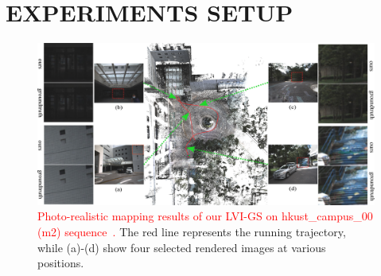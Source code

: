 \documentclass[lettersize,journal]{IEEEtran}
\begin{document}
\section{EXPERIMENTS SETUP}
\begin{figure}[ht]  %
        \captionsetup{justification=justified, labelsep=colon}%
        \centering
        \includegraphics[width=2.0\columnwidth]{image/fullseq/fullseq.pdf}
        \caption{
        \textcolor{red}{
        Photo-realistic mapping results of our LVI-GS on hkust_campus_00 (m2) sequence~\cite{r3live}. 
        }
        The red line represents the running trajectory, while (a)-(d) show four selected rendered images at various positions.
        }
        \label{fig:fullseq}
\end{figure}%
\end{document}
